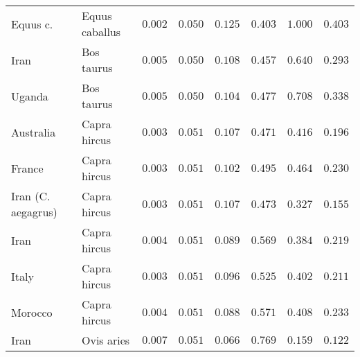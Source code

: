 \documentclass{article}
\begin{document}
\begin{center}
\begin{longtable*}{|l|l|r|r|r|r|r|r|}
            \bottomrule
            \endlastfoot
            Equus c. &      Equus caballus &               $ 0.002$ &             $ 0.050$ &              $ 0.125$ &                                     $ 0.403$ &                       $ 1.000$ &                 $ 0.403$ \\
            Iran &          Bos taurus &               $ 0.005$ &             $ 0.050$ &              $ 0.108$ &                                     $ 0.457$ &                       $ 0.640$ &                 $ 0.293$ \\
            Uganda &          Bos taurus &               $ 0.005$ &             $ 0.050$ &              $ 0.104$ &                                     $ 0.477$ &                       $ 0.708$ &                 $ 0.338$ \\
            Australia &        Capra hircus &               $ 0.003$ &             $ 0.051$ &              $ 0.107$ &                                     $ 0.471$ &                       $ 0.416$ &                 $ 0.196$ \\
            France &        Capra hircus &               $ 0.003$ &             $ 0.051$ &              $ 0.102$ &                                     $ 0.495$ &                       $ 0.464$ &                 $ 0.230$ \\
            Iran (C. aegagrus) &        Capra hircus &               $ 0.003$ &             $ 0.051$ &              $ 0.107$ &                                     $ 0.473$ &                       $ 0.327$ &                 $ 0.155$ \\
            Iran &        Capra hircus &               $ 0.004$ &             $ 0.051$ &              $ 0.089$ &                                     $ 0.569$ &                       $ 0.384$ &                 $ 0.219$ \\
            Italy &        Capra hircus &               $ 0.003$ &             $ 0.051$ &              $ 0.096$ &                                     $ 0.525$ &                       $ 0.402$ &                 $ 0.211$ \\
            Morocco &        Capra hircus &               $ 0.004$ &             $ 0.051$ &              $ 0.088$ &                                     $ 0.571$ &                       $ 0.408$ &                 $ 0.233$ \\
            Iran &          Ovis aries &               $ 0.007$ &             $ 0.051$ &              $ 0.066$ &                                     $ 0.769$ &                       $ 0.159$ &                 $ 0.122$ \\

\end{longtable*}
\end{center}
\end{document}
